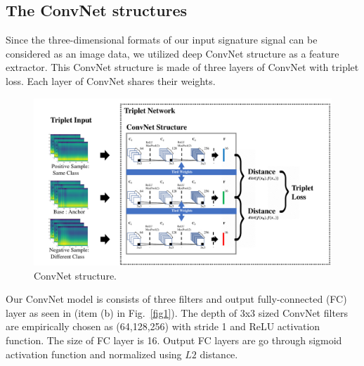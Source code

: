 \subsection{The ConvNet structures}
Since the three-dimensional formats of our input signature signal can be considered as an image data, we utilized deep ConvNet structure as a feature extractor. This ConvNet structure is made of three layers of ConvNet with triplet loss. Each layer of ConvNet shares their weights. 
\begin{figure}[!ht]
    \includegraphics[width=\textwidth]
        {fig_convnet_v1.pdf}
    \caption{ConvNet structure.} \label{fig3}
\end{figure}
Our ConvNet model is consists of three filters and output fully-connected (FC) layer as seen in (item (b) in Fig.~\ref{fig1}). The depth of 3x3 sized ConvNet filters are empirically chosen as (64,128,256) with stride 1 and ReLU activation function. The size of FC layer is 16. Output FC layers are go through sigmoid activation function and normalized using $L2$ distance.

